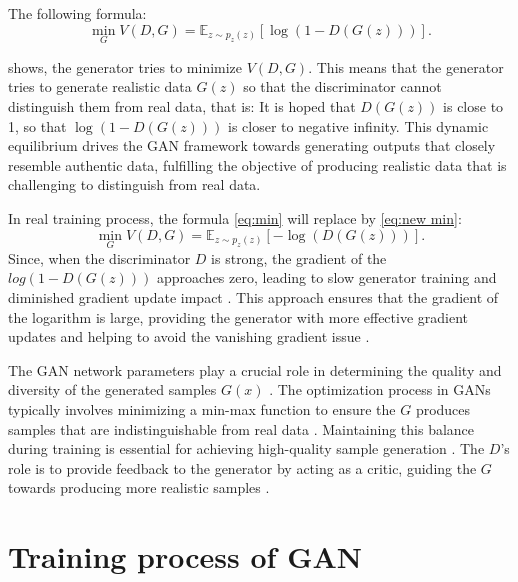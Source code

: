 The following formula:
\begin{equation}
    \label{eq:min}
    \min_{G} V(D, G) = \mathbb{E}_{z \sim p_{z}(z)} [\log(1 - D(G(z)))].
\end{equation}

shows, the generator tries to minimize $V(D, G)$. 
This means that the generator tries to generate realistic data $G(z)$ so that the discriminator cannot distinguish 
them from real data, that is: It is hoped that $D(G(z))$ is close to 1, so that $\log (1 - D(G(z)))$ is closer to negative infinity.
This dynamic equilibrium drives the GAN framework towards generating outputs that closely resemble authentic data, 
fulfilling the objective of producing realistic data that is challenging to distinguish from real data.




In real training process, the formula \eqref{eq:min} will replace by \eqref{eq:new min}:
\begin{equation}
    \label{eq:new min}
    \min_{G} V(D, G) = \mathbb{E}_{z \sim p_{z}(z)} [-\log(D(G(z)))].
\end{equation}
Since, when the discriminator $ D$ is strong, 
the gradient of the $log(1 - D(G(z)))$ approaches zero, leading to slow generator training and diminished gradient update impact \citep{10.1007/s11263-019-01265-2}.  
This approach ensures that the gradient of the logarithm is large, providing the generator with more effective gradient updates and 
helping to avoid the vanishing gradient issue \citep{10.1109/tpami.2018.2872043}.



The GAN network parameters play a crucial role in determining the quality and diversity of 
the generated samples $G(x)$ \citep{10.1007/s10928-021-09787-4}. The optimization process in GANs 
typically involves minimizing a min-max function to ensure the $G$ produces samples that 
are indistinguishable from real data \citep{10.1109/taslp.2017.2761547}. Maintaining this balance 
during training is essential for achieving high-quality sample generation \citep{10.1007/s10928-021-09787-4}. 
The $D$'s role is to provide feedback to the generator by acting as a critic, 
guiding the $G$ towards producing more realistic samples \citep{10.48550/arxiv.1802.05637}.



\section{Training process of GAN}

